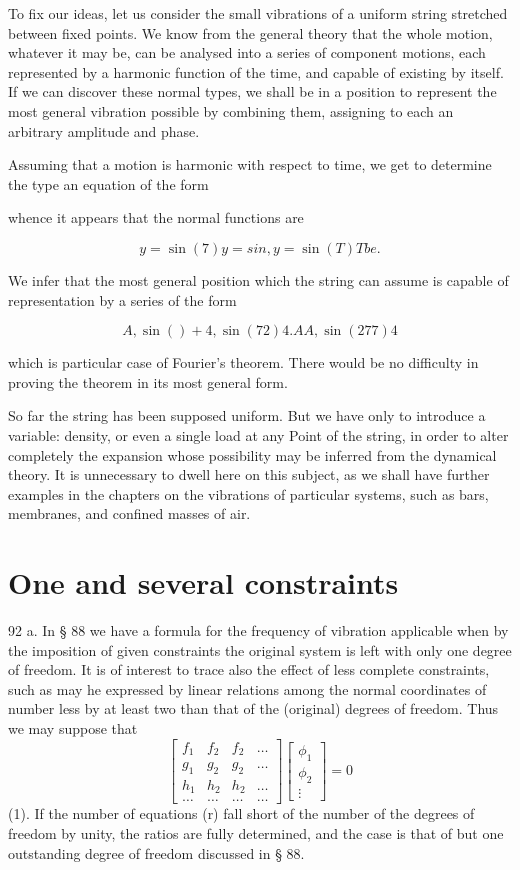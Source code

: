 To fix our ideas, let us consider the small vibrations of a uniform string
stretched between fixed points. We know from the general theory that the whole
motion, whatever it may be, can be analysed into a series of component motions,
each represented by a harmonic function of the time, and capable of existing by
itself. If we can discover these normal types, we shall be in a position to
represent the most general vibration possible by combining them, assigning to
each an arbitrary amplitude and phase.

Assuming that a motion is harmonic with respect to time, we get to determine
the type an equation of the form

whence it appears that the normal functions are

\[y= \sin(7)  y= sin, y= \sin(T)T be.\]

We infer that the most general position which the string can assume is capable
of representation by a series of the form

\[A, \sin()+4, \sin(72) 4. A A, \sin(277) 4\]

which is particular case of Fourier's theorem. There would be no difficulty in
proving the theorem in its most general form.

So far the string has been supposed uniform. But we have only to introduce a
variable: density, or even a single load at any Point of the string, in order
to alter completely the expansion whose possibility may be inferred from the
dynamical theory. It is unnecessary to dwell here on this subject, as we shall
have further examples in the chapters on the vibrations of particular systems,
such as bars, membranes, and confined masses of air.

\section{One and several constraints} 92 a.
In § 88 we have a formula for the frequency of vibration applicable when by the
imposition of given constraints the original system is left with only one
degree of freedom. It is of interest to trace also the effect of less complete
constraints, such as may he expressed by linear relations among the
normal coordinates of number less by at least two than that of the
(original) degrees of freedom. Thus we may suppose that
\[
\begin{bmatrix} f_1 & f_2 & f_2 & \ldots \\ g_1 & g_2 & g_2 & \ldots \\
h_1 & h_2 & h_2 & \ldots \\ \ldots & \ldots & \ldots & \ldots
\end{bmatrix} \begin{bmatrix} \phi_1 \\ \phi_2 \\ \vdots \end{bmatrix} = 0
\]
(1).  If the number of equations (r) fall short of the number of
the degrees of freedom by unity, the ratios are fully determined, and
the case is that of but one outstanding degree of freedom discussed in § 88.

